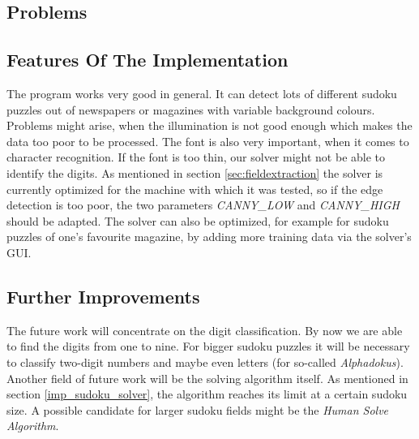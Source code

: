 \documentclass[
a4paper,     %
12pt         %
]{scrartcl}  %
\begin{document}
\subsection{Problems}

\subsection{Features Of The Implementation}
The program works very good in general. It can detect lots of different sudoku puzzles out of newspapers or magazines with variable background colours.
Problems might arise, when the illumination is not good enough which makes the data too poor to be processed. The font is also very important,
when it comes to character recognition. If the font is too thin, our solver might not be able to identify the digits. As mentioned in section 
\ref{sec:fieldextraction} the solver is currently optimized for the machine with which it was tested, so if the edge detection is too poor, 
the two parameters \emph{CANNY\_LOW} and \emph{CANNY\_HIGH} should be adapted. The solver can also be optimized, for example for sudoku puzzles
of one's favourite magazine, by adding more training data via the solver's GUI.

\subsection{Further Improvements}
The future work will concentrate on the digit classification. By now we are able to find the digits from one to nine. For bigger sudoku puzzles
it will be necessary to classify two-digit numbers and maybe even letters (for so-called \emph{Alphadokus}). Another field of future work will
be the solving algorithm itself. As mentioned in section \ref{imp_sudoku_solver}, the algorithm reaches its limit at a certain sudoku size. A 
possible candidate for larger sudoku fields might be the \emph{Human Solve Algorithm}.




% 

% 
\end{document}
